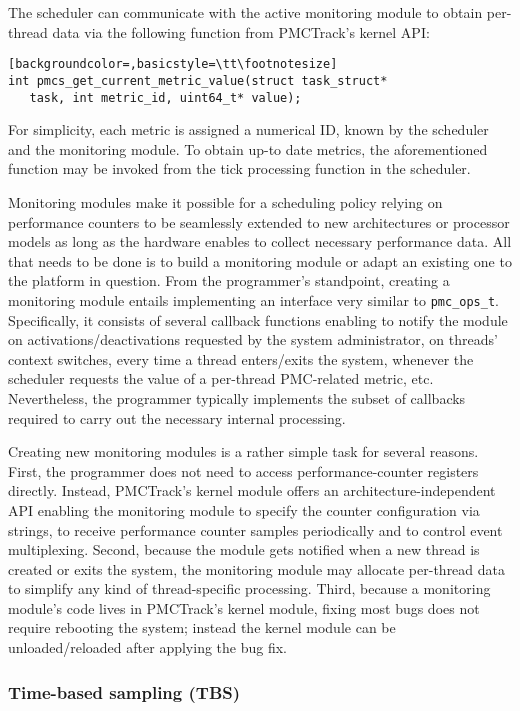 The scheduler can communicate with the active monitoring module to
obtain per-thread data via the following function from PMCTrack's kernel
API:

\begin{lstlisting}[backgroundcolor=,basicstyle=\tt\footnotesize]
int pmcs_get_current_metric_value(struct task_struct*
   task, int metric_id, uint64_t* value);
\end{lstlisting}

For simplicity, each metric is assigned a numerical ID, known by the
scheduler and the monitoring module. To obtain up-to date metrics, the
aforementioned function may be invoked from the tick processing function
in the scheduler.

Monitoring modules make it possible for a scheduling policy relying on
performance counters to be seamlessly extended to new architectures or
processor models as long as the hardware enables to collect necessary
performance data. All that needs to be done is to build a monitoring
module or adapt an existing one to the platform in question. From the
programmer's standpoint, creating a monitoring module entails
implementing an interface very similar to \texttt{pmc\_ops\_t}.
Specifically, it consists of several callback functions enabling to
notify the module on activations/deactivations requested by the system
administrator, on threads' context switches, every time a thread
enters/exits the system, whenever the scheduler requests the value of a
per-thread PMC-related metric, etc. Nevertheless, the programmer
typically implements the subset of callbacks required to carry out the
necessary internal processing.

Creating new monitoring modules is a rather simple task for several
reasons. First, the programmer does not need to access
performance-counter registers directly. Instead, PMCTrack's kernel
module offers an architecture-independent API enabling the monitoring
module to specify the counter configuration via strings, to receive
performance counter samples periodically and to control event
multiplexing. Second, because the module gets notified when a new thread
is created or exits the system, the monitoring module may allocate
per-thread data to simplify any kind of thread-specific processing.
Third, because a monitoring module's code lives in PMCTrack's kernel
module, fixing most bugs does not require rebooting the system; instead
the kernel module can be unloaded/reloaded after applying the bug fix.

\subsubsection{Time-based sampling (TBS)}\label{time-based-sampling-tbs}

